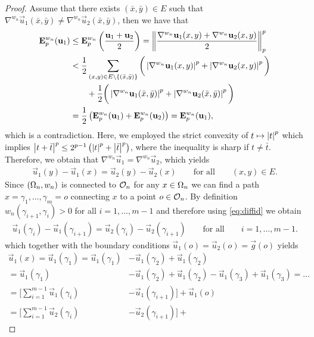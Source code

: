 \begin{proof}
Assume that there exists $(\bar x,\bar y)\in E$ such that $\nabla^{w_n} \vec u_1(\bar x,\bar y)\neq \nabla^{w_n}\vec u_2(\bar x,\bar y)$, then we have that
%
\begin{align*}
\mathbf{E}^{w_n}_p (\mathbf{u}_1) &\leq \mathbf{E}^{w_n}_p \left(\frac{\mathbf{u}_1 + \mathbf{u}_2}{2}\right) =
\left\|\frac{\nabla^{w_n} \mathbf{u}_1(x,y) + \nabla^{w_n} \mathbf{u}_2(x,y)}{2}\right\|^p_p\\
&<
\frac{1}{2} \sum_{(x,y)\in E\setminus\{(\bar x,\bar y)\}} \bigg(\left|\nabla^{w_n} \mathbf{u}_1(x,y)\right|^p + \left|\nabla^{w_n} \mathbf{u}_2(x,y)\right|^p\bigg)
\\ 
&\qquad+\frac{1}{2}\bigg( \left|\nabla^{w_n} \mathbf{u}_1(\bar x, \bar y)\right|^p + \left|\nabla^{w_n} \mathbf{u}_2(\bar x, \bar y)\right|^p\bigg)\\
&= 
\frac{1}{2}\left(\mathbf{E}^{w_n}_p (\mathbf{u}_1) + \mathbf{E}^{w_n}_p (\mathbf{u}_2)\right) 
= \mathbf{E}^{w_n}_p (\mathbf{u}_1),
\end{align*}
%
which is a contradiction. Here, we employed the strict convexity of $t\mapsto \left|t\right|^p$ which implies $\left|t+\bar t\right|^p \leq 2^{p-1} \left(\left|t\right|^p + \left|\bar t\right|^{p}\right)$, where the inequality is sharp if $t\neq \bar t$. Therefore, we obtain that $\nabla^{w_n} \vec u_1 = \nabla^{w_n}\vec u_2$, which yields
%
\begin{align}\label{eq:diffid}
\vec u_1(y) - \vec u_1(x) = \vec u_2(y) - \vec u_2(x) \qquad\text{for all}\qquad (x,y)\in E.
\end{align}
%
Since $(\Omega_n, w_n)$ is connected to $\mathcal{O}_n$ for any $x\in\Omega_n$ we can find a path $x=\gamma_1,\ldots,\gamma_m=o$ connecting $x$ to a point $o\in\mathcal{O}_n$. By definition $w_n(\gamma_{i+1}, \gamma_i) >0$ for all $i=1,\ldots, m-1$ and therefore using \cref{eq:diffid} we obtain
%
\begin{align*}
\vec u_1(\gamma_{i}) - \vec u_1(\gamma_{i+1}) = \vec u_2(\gamma_{i}) - \vec u_2(\gamma_{i+1}) \qquad\text{for all}\qquad i=1,\ldots,m-1.
\end{align*}
%
which together with the boundary conditions $\vec u_1(o)=\vec u_2(o)=\vec g(o)$ yields
%
\begin{align*}
\vec u_1(x) = 
\vec u_1(\gamma_1)= \vec u_1(\gamma_1) &- \vec u_1(\gamma_2) + \vec u_1(\gamma_2)\\
%
=\vec u_1(\gamma_1) &- \vec u_1(\gamma_2) + \vec u_1(\gamma_2) - \vec u_1(\gamma_3) + \vec u_1(\gamma_3)=\ldots\\
%
=\Bigg[\sum_{i=1}^{m-1} \vec u_1(\gamma_{i}) &- \vec u_1(\gamma_{i+1})\Bigg] + 
\vec u_1(o)\\
= \Bigg[\sum_{i=1}^{m-1} \vec u_2(\gamma_{i}) &- \vec u_2(\gamma_{i+1})\Bigg] + 

\end{align*}
\end{proof}
